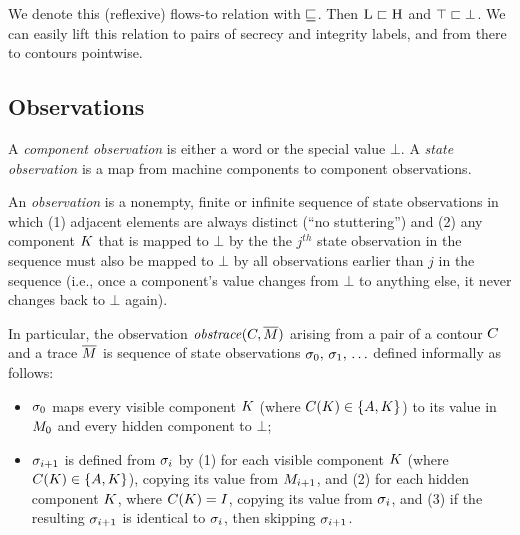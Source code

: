 \documentclass[conference]{IEEEtran}
\begin{document}
%
We denote this (reflexive) flows-to relation with $\sqsubseteq$. Then
$\textsc{L} \sqsubset \textsc{H}$ and $\top \sqsubset
\bot$. We can easily lift this relation to pairs of secrecy and
integrity labels, and from there to contours pointwise.

\subsection{Observations}


A {\em component observation} is either a word or the special value $\bot$.
A {\em state observation} is a map from machine components to component
observations.

An {\em observation} is a nonempty, finite or infinite sequence of state
observations in which (1) adjacent elements are always distinct (``no
stuttering'') and (2) any component $K$ that is mapped to $\bot$ by
the the $j^{th}$ state observation in the sequence must also be mapped to
$\bot$ by all observations earlier than $j$ in the sequence (i.e., once a
component's value changes from $\bot$ to anything else, it never changes
back to $\bot$ again).

In particular, the observation $\mathit{obstrace}(C, \overline{M})$
arising from a pair of a contour $C$ and a trace $\overline{M}$
is sequence of state observations $\sigma_0,\, \sigma_1,\,
\ldots$ defined informally as follows:
\begin{itemize}
\item $\sigma_0$ maps every visible component $K$ (where
  $C(K) \in \{A, K\}$) to its value in $M_0$
  and every hidden component to $\bot$;
\item $\sigma_{i+1}$ is defined from $\sigma_{i}$ by (1) for
  each visible component $K$ (where $C(K) \in
  \{A, K\}$), copying its value from $M_{i+1}$, and (2) for
  each hidden component $K$, where $C (K) =
  I$, copying its value from $\sigma_{i}$, and (3) if
  the resulting $\sigma_{i+1}$ is identical to $\sigma_{i}$,
  then skipping $\sigma_{i+1}$.  \iftext{}\fi
\end{itemize}
\end{document}
